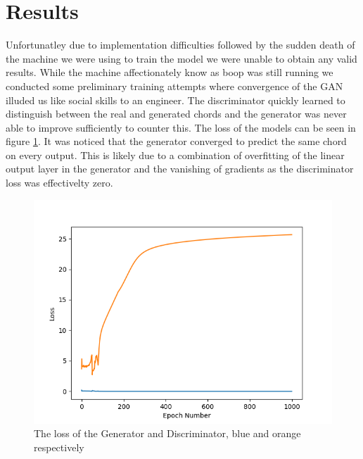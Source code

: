 \section{Results}
Unfortunatley due to implementation difficulties followed by the sudden death of the machine we were using to train the model we were unable to obtain any valid results.
While the machine affectionately know as boop was still running we conducted some preliminary training attempts where convergence  of the GAN illuded us like social skills to an engineer.
The discriminator quickly learned to distinguish between the real and generated chords and the generator was never able to improve sufficiently to counter this.
The loss of the models can be seen in figure \ref{fig:ModelLoss}.
It was noticed that the generator converged to predict the same chord on every output. 
This is likely due to a combination of overfitting of the linear output layer in the generator and the vanishing of gradients as the discriminator loss was effectivelty zero.

\begin{figure}
    \centering
    \includegraphics[width=0.4\columnwidth]{Figures/ModelLoss}
    \decoRule
    \caption{The loss of the Generator and Discriminator, blue and orange respectively}
    \label{fig:ModelLoss}
\end{figure}
